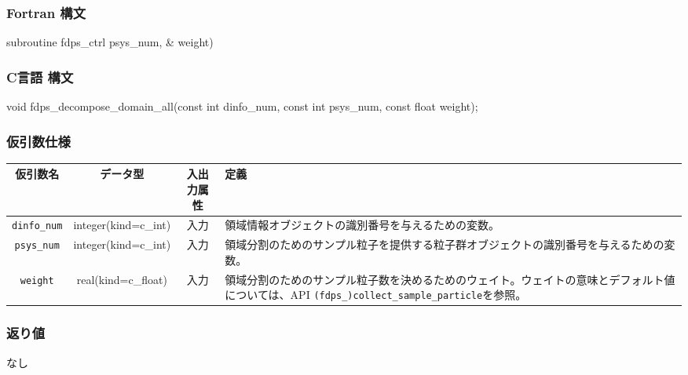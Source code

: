 \subsubsection*{Fortran 構文}
\begin{screen}
\begin{spverbatim}
subroutine fdps_ctrl%
                                          psys_num,  &
                                          weight)
\end{spverbatim}
\end{screen}

\subsubsection*{C言語 構文}
\begin{screen}
\begin{spverbatim}
void fdps_decompose_domain_all(const int dinfo_num, 
                               const int psys_num,  
                               const float weight); 
\end{spverbatim}
\end{screen}



\subsubsection*{仮引数仕様}
\begin{table}[h]
\begin{tabularx}{\linewidth}{cccX}
\toprule
\rowcolor{Snow2}
仮引数名 & データ型 & 入出力属性 & 定義 \\
\midrule
\texttt{dinfo\_num} & integer(kind=c\_int) & 入力 & 領域情報オブジェクトの識別番号を与えるための変数。\\
\texttt{psys\_num} & integer(kind=c\_int) & 入力 & 領域分割のためのサンプル粒子を提供する粒子群オブジェクトの識別番号を与えるための変数。 \\
\texttt{weight} & real(kind=c\_float) & 入力 & 領域分割のためのサンプル粒子数を決めるためのウェイト。ウェイトの意味とデフォルト値については、API \texttt{(fdps\_)collect\_sample\_particle}を参照。\\
\bottomrule
\end{tabularx}
\end{table}

\subsubsection*{返り値}
なし

